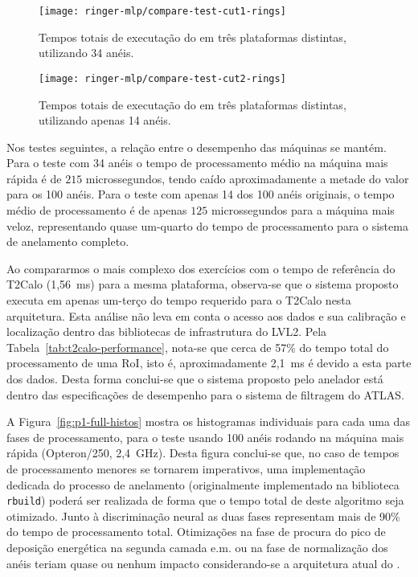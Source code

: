 \begin{figure}
\begin{center}
\texttt{[image: ringer-mlp/compare-test-cut1-rings]}
\end{center}
\caption{Tempos totais de executação do  em três plataformas
distintas, utilizando 34 anéis.}
\label{fig:timings-histo-cut1}
\end{figure}

\begin{figure}
\begin{center}
\texttt{[image: ringer-mlp/compare-test-cut2-rings]}
\end{center}
\caption{Tempos totais de executação do  em três plataformas
distintas, utilizando apenas 14 anéis.}
\label{fig:timings-histo-cut2}
\end{figure}

Nos testes seguintes, a relação entre o desempenho das máquinas se
mantém. Para o teste com 34 anéis o tempo de processamento médio na máquina
mais rápida é de $215$ microssegundos, tendo caído aproximadamente a metade do
valor para os 100 anéis. Para o teste com apenas 14 dos 100 anéis originais, o
tempo médio de processamento é de apenas $125$ microssegundos para a máquina
mais veloz, representando quase um-quarto do tempo de processamento para o
sistema de anelamento completo.

Ao compararmos o mais complexo dos exercícios com o tempo de referência do
T2Calo (1,56~ms) para a mesma plataforma, observa-se que o sistema proposto
executa em apenas um-terço do tempo requerido para o T2Calo nesta
arquitetura. Esta análise não leva em conta o acesso aos dados e sua
calibração e localização dentro das bibliotecas de infrastrutura do LVL2. Pela
Tabela~\ref{tab:t2calo-performance}, nota-se que cerca de 57\% do tempo total
do processamento de uma RoI, isto é, aproximadamente 2,1~ms é devido a esta
parte dos dados. Desta forma conclui-se que o sistema proposto pelo anelador
está dentro das especificações de desempenho para o sistema de filtragem do
ATLAS.

A Figura~\ref{fig:p1-full-histos} mostra os histogramas individuais para cada
uma das fases de processamento, para o teste usando 100 anéis rodando na
máquina mais rápida (Opteron/250, 2,4~GHz). Desta figura conclui-se que, no
caso de tempos de processamento menores se tornarem imperativos, uma
implementação dedicada do processo de anelamento (originalmente implementado
na biblioteca \texttt{rbuild}) poderá ser realizada de forma que o tempo total
de deste algoritmo seja otimizado. Junto à discriminação neural as duas fases
representam mais de 90\% do tempo de processamento total. Otimizações na fase
de procura do pico de deposição energética na segunda camada e.m. ou na fase
de normalização dos anéis teriam quase ou nenhum impacto considerando-se a
arquitetura atual do .

